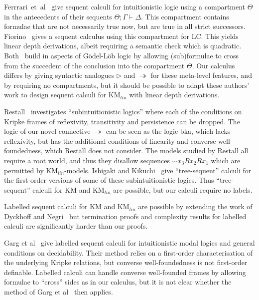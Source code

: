 \documentclass[envcountsect,envcountsame]{llncs}
\newcommand{\iimp}{\twoheadrightarrow}
\newcommand{\lcnxt}{\mathrm{KM}_{lin}}
\newcommand{\lgkm}{\mathrm{KM}}
\newcommand{\lglc}{\mathrm{LC}}
\newcommand{\nxt}{\rhd}
\newcommand{\seq}{\vdash}
\begin{document}
Ferrrari~et~al~\cite{DBLP:journals/jar/FerrariFF13} 
give sequent calculi for 
intuitionistic logic using
a compartment $\Theta$ in
the antecedents of their
sequents $\Theta ; \Gamma \seq \Delta$. This 
compartment contains
formulae that are not necessarily true now, but are true 
in all strict successors.
Fiorino~\cite{DBLP:journals/corr/abs-1206-4458} gives a sequent calculus using
this compartment for $\lglc$.
This yields linear depth derivations, albeit requiring a semantic check which is quadratic.
Both~\cite{DBLP:journals/jar/FerrariFF13,DBLP:journals/corr/abs-1206-4458} build in
aspects of G\"{o}del-L\"{o}b logic by allowing (sub)formulae to
cross from the succedent of the conclusion into the
compartment $\Theta$.
Our calculus differs by giving syntactic
analogues $\nxt$ and $\iimp$ for these meta-level features,
and by requiring no compartments, but
it should be possible to adapt these authors' work to 
design sequent calculi for $\lcnxt$ with linear depth derivations.

Restall~\cite{restall-subintuitionistic-logics} investigates
``subintuitionistic logics'' where each of the conditions on Kripke frames of
reflexivity, transitivity and persistence can be dropped. The logic of our novel
connective $\iimp$ can be seen as the logic bka, which lacks reflexivity, but
has the additional conditions of linearity and converse well-foundedness, which Restall
does not consider. 
The models studied by Restall all require a root world, and thus
they disallow sequences $\cdots x_3 R x_2 R x_1$ 
which are permitted by $\lcnxt$-models.
Ishigaki and Kikuchi~\cite{DBLP:conf/tableaux/IshigakiK07} 
give ``tree-sequent'' calculi for the first-order versions of
some of these subintuitionistic logics. 
Thus ``tree-sequent'' calculi
for $\lgkm$ and $\lcnxt$ are possible, but our calculi require no labels.

Labelled sequent calculi for $\lgkm$
and $\lcnxt$ are possible by extending the work of 
Dyckhoff and Negri~\cite{DBLP:journals/aml/DyckhoffN12} but
termination proofs and complexity results
for labelled calculi are significantly harder than
our proofs. 

Garg et al~\cite{DBLP:conf/lics/GargGN12} give labelled
sequent
calculi for intuitionistic modal logics and general conditions on
decidability. Their method relies on a first-order
characterisation of the underlying Kripke relations, but
converse well-foundedness is not first-order definable.
Labelled calculi can handle converse well-founded frames 
by allowing formulae to ``cross'' sides as in our
calculus, but it is not clear whether the method of 
Garg et al~\cite{DBLP:conf/lics/GargGN12} then applies.
\end{document}
